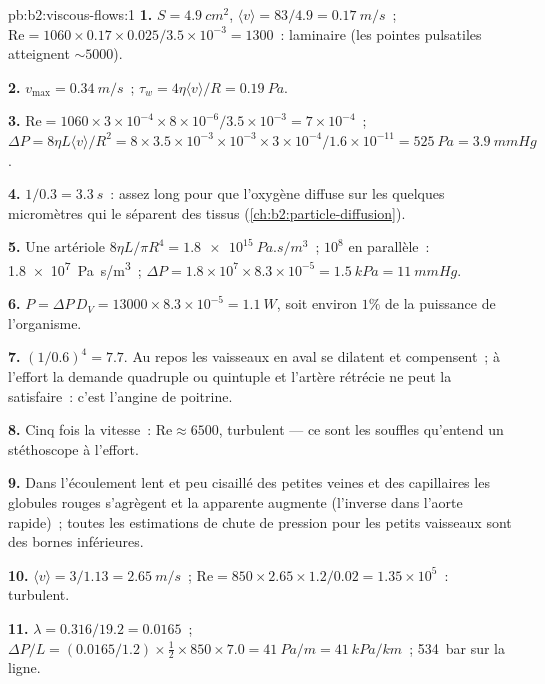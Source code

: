\begin{solution}{pb:b2:viscous-flows:1}
\textbf{1.} $S = \qty{4.9}{cm^2}$, $\langle v\rangle = 83/4.9 = \qty{0.17}{m/s}$~; $\mathrm{Re}
= 1060 \times 0.17 \times 0.025/3.5 \times 10^{-3} = 1300$~: laminaire (les pointes pulsatiles
atteignent $\sim 5000$).

\textbf{2.} $v_{\max} = \qty{0.34}{m/s}$~; $\tau_w = 4\eta\langle v\rangle/R = \qty{0.19}{Pa}$.

\textbf{3.} $\mathrm{Re} = 1060 \times 3 \times 10^{-4} \times 8 \times 10^{-6}/3.5 \times 10^{-3} =
7 \times 10^{-4}$~; $\Delta P = 8\eta L\langle v\rangle/R^2 = 8 \times 3.5 \times 10^{-3} \times 10^{-3}
\times 3 \times 10^{-4}/1.6 \times 10^{-11} = \qty{525}{Pa} = \qty{3.9}{mmHg}$.

\textbf{4.} $1/0.3 = \qty{3.3}{s}$~: assez long pour que l'oxygène diffuse sur les quelques
micromètres qui le séparent des tissus (\cref{ch:b2:particle-diffusion}).

\textbf{5.} Une artériole $8\eta L/\pi R^4 = \qty{1.8e15}{Pa.s/m^3}$~; $10^8$ en
parallèle~: \qty{1.8e7}{Pa.s/m^3}~; $\Delta P = 1.8 \times 10^7 \times 8.3 \times 10^{-5} =
\qty{1.5}{kPa} = \qty{11}{mmHg}$.

\textbf{6.} $P = \Delta P\,D_V = 13000 \times 8.3 \times 10^{-5} = \qty{1.1}{W}$, soit environ
$1\%$ de la puissance de l'organisme.

\textbf{7.} $(1/0.6)^4 = 7.7$. Au repos les vaisseaux en aval se dilatent et
compensent~; à l'effort la demande quadruple ou quintuple et
l'artère rétrécie ne peut la satisfaire~: c'est l'angine de poitrine.

\textbf{8.} Cinq fois la vitesse~: $\mathrm{Re} \approx 6500$, turbulent --- ce sont les
souffles qu'entend un stéthoscope à l'effort.

\textbf{9.} Dans l'écoulement lent et peu cisaillé des petites veines et des capillaires
les globules rouges s'agrègent et la  apparente augmente (l'inverse
dans l'aorte rapide)~; toutes les estimations de chute de pression pour les petits vaisseaux
sont des bornes inférieures.

\textbf{10.} $\langle v\rangle = 3/1.13 = \qty{2.65}{m/s}$~; $\mathrm{Re} = 850 \times 2.65 \times
1.2/0.02 = 1.35 \times 10^5$~: turbulent.

\textbf{11.} $\lambda = 0.316/19.2 = 0.0165$~; $\Delta P/L = (0.0165/1.2) \times \tfrac12 \times
850 \times 7.0 = \qty{41}{Pa/m} = \qty{41}{kPa/km}$~; \qty{534}{bar} sur la ligne.


\end{solution}
